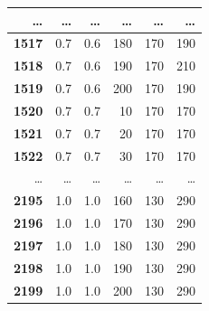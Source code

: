 \documentclass[a4paper,12pt]{article}
\begin{document}
\begin{table} [h!]
\begin{center}
\begin{tabular}{|r|r|r|r|r|r|}
\hline
\ldots & \ldots & \ldots & \ldots & \ldots & \ldots\\
\hline
{\bf 1517} &        0.7 &        0.6 &        180 &        170 &        190 \\
\hline
{\bf 1518} &        0.7 &        0.6 &        190 &        170 &        210 \\
\hline
{\bf 1519} &        0.7 &        0.6 &        200 &        170 &        190 \\
\hline
{\bf 1520} &        0.7 &        0.7 &         10 &        170 &        170 \\
\hline
{\bf 1521} &        0.7 &        0.7 &         20 &        170 &        170 \\
\hline
{\bf 1522} &        0.7 &        0.7 &         30 &        170 &        170 \\
\hline
\ldots & \ldots & \ldots & \ldots & \ldots & \ldots\\
\hline
{\bf 2195} &        1.0 &        1.0 &      160 &        130 &        290 \\
\hline
{\bf 2196} &        1.0 &        1.0 &      170 &        130 &        290 \\
\hline
{\bf 2197} &        1.0 &        1.0 &      180 &        130 &        290 \\
\hline
{\bf 2198} &        1.0 &        1.0 &      190 &        130 &        290 \\
\hline
{\bf 2199} &        1.0 &        1.0 &      200 &        130 &        290 \\
\hline
\end{tabular}  
\label{param2}
\end{center}
\end{table} 
\end{document}
